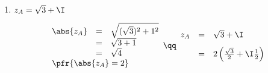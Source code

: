 \documentclass[10pt,french]{book}
\begin{document}
{\begin{enumerate}
\begin{enumerate}
\hspace*{-2cm}
        \begin{tabularx}{1.2\linewidth}{>\centering X|>\centering X|>{\centering\arraybackslash} X}
            $\begin{array}{rcl}
                AB & = & \abs{z_B - z_A} \\
                &=& \abs{\sqrt3 - 3\I - (\sqrt 3 + \I)} \\[5pt]
                &=&  \abs{\sqrt 3 - 3\I -\sqrt 3 - \I} \\[5pt]
                &=&\abs{-4\I}\\
                \multicolumn{3}{l}{\pfr{AB = 4}}
            \end{array}$ &
            $\begin{array}{rcl}
                AC & = & \abs{z_C - z_A} \\
                &=& \abs{3\sqrt3 - \I - (\sqrt 3 + \I)} \\[5pt]
                &=&  \abs{3\sqrt 3 - \I -\sqrt 3 - \I} \\[5pt]
                &=&\abs{2\sqrt 3 - 2\I}\\[5pt]
                &=&\sqrt{(2\sqrt 3)^2 + (-2)^2}\\
                &=&\sqrt{16}\\
                \multicolumn{3}{l}{\pfr{AC = 4}}
            \end{array}$ &
            $\begin{array}{rcl}
                BC & = & \abs{z_C - z_B} \\
                &=& \abs{3\sqrt3 - \I - (\sqrt 3 - 3\I)} \\[5pt]
                &=&  \abs{3\sqrt 3 - \I -\sqrt 3 + 3\I} \\[5pt]
                &=&\abs{2\sqrt 3 + 2\I}\\[5pt]
                &=&\sqrt{(2\sqrt 3)^2 + 2^2}\\
                &=&\sqrt{16}\\
                \multicolumn{3}{l}{\pfr{BC = 4}}
            \end{array}$
        \end{tabularx}\medskip
    
    $AB = BC = AC$ donc le triangle $ABC$ est bien un triangle équilatéral.

\item $z_A= \sqrt 3 + \I$

\[\begin{array}{rcl}
\abs{z_A }& = & \sqrt{(\sqrt 3)^2 + 1^2}\\
            & = & \sqrt{3 + 1} \\
            & = & \sqrt{4} \\
    \multicolumn{3}{l}{\pfr{\abs{z_A} = 2}}
\end{array} \qq
\begin{array}{rcl}
z_A& = & \sqrt 3 + \I \\[8pt]
            & = & 2\left(\frac{\sqrt 3}{2} + \I\frac{1}{2}\right)
\end{array}\]


\end{enumerate}
\end{enumerate}}
\end{document}
